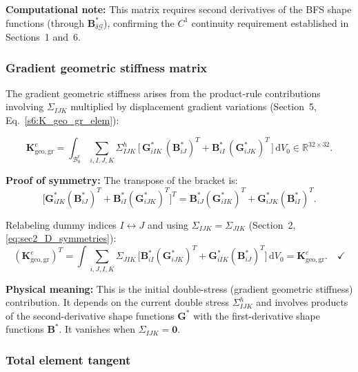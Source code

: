 \documentclass[11pt]{article}
\begin{document}
\textbf{Computational note:}
This matrix requires second derivatives of the BFS shape functions
(through $\mathbf{B}_{\delta\mathcal{G}}^{*}$), confirming the $C^{1}$
continuity requirement established in Sections~1 and~6.

\subsubsection{Gradient geometric stiffness matrix}
\label{ssec:K_geo_gr}

The gradient geometric stiffness arises from the product-rule
contributions involving $\Sigma_{IJK}$ multiplied by displacement
gradient variations (Section~5, Eq.~\eqref{s6:K_geo_gr_elem}):

\begin{equation}
\boxed{
\mathbf{K}_{\mathrm{geo,gr}}^{e}
= \int_{\mathcal{B}_{0}^{e}}
  \sum_{i,I,J,K}
  \Sigma_{IJK}^{h}\,
  \bigl[\,\mathbf{G}_{iIK}^{*}\,(\mathbf{B}_{iJ}^{*})^{T}
       + \mathbf{B}_{iI}^{*}\,(\mathbf{G}_{iJK}^{*})^{T}\,\bigr]\,
  \mathrm{d}V_{0}
\in \mathbb{R}^{32\times 32}.
}
\label{s7:K_geo_gr}
\end{equation}

\textbf{Proof of symmetry:}
The transpose of the bracket is:
\begin{equation}
\bigl[\mathbf{G}_{iIK}^{*}(\mathbf{B}_{iJ}^{*})^{T}
 + \mathbf{B}_{iI}^{*}(\mathbf{G}_{iJK}^{*})^{T}\bigr]^{T}
= \mathbf{B}_{iJ}^{*}(\mathbf{G}_{iIK}^{*})^{T}
 + \mathbf{G}_{iJK}^{*}(\mathbf{B}_{iI}^{*})^{T}.
\end{equation}

Relabeling dummy indices $I\leftrightarrow J$ and using
$\Sigma_{IJK}=\Sigma_{JIK}$ (Section~2, \eqref{eq:sec2_D_symmetries}):
\begin{equation}
(\mathbf{K}_{\mathrm{geo,gr}}^{e})^{T}
= \int \sum_{i,J,I,K}
  \Sigma_{JIK}\,
  \bigl[\mathbf{B}_{iI}^{*}(\mathbf{G}_{iJK}^{*})^{T}
       + \mathbf{G}_{iIK}^{*}(\mathbf{B}_{iJ}^{*})^{T}\bigr]\,
  \mathrm{d}V_{0}
= \mathbf{K}_{\mathrm{geo,gr}}^{e}. \quad\checkmark
\end{equation}

\textbf{Physical meaning:}
This is the initial double-stress (gradient geometric stiffness)
contribution. It depends on the current double stress
$\Sigma_{IJK}^{h}$ and involves products of the second-derivative
shape functions $\mathbf{G}^{*}$ with the first-derivative shape
functions $\mathbf{B}^{*}$. It vanishes when
$\Sigma_{IJK}=\mathbf{0}$.

\subsubsection{Total element tangent}
\label{ssec:total_tangent}
\end{document}
